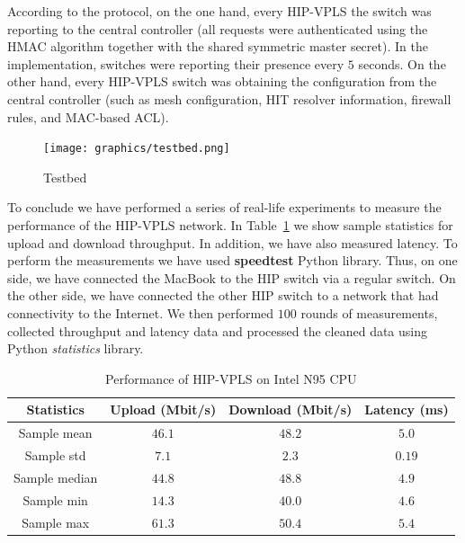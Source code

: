 According to the protocol, on the one hand, every HIP-VPLS 
the switch was reporting to the central controller (all requests were authenticated 
using the HMAC algorithm together with the shared symmetric 
master secret). In the implementation, switches were reporting 
their presence every $5$ seconds. On the other hand, every HIP-VPLS switch was obtaining 
the configuration from the central controller (such as mesh 
configuration, HIT resolver information, firewall rules, and 
MAC-based ACL). 

\begin{figure}[!ht]
    \centering
    \texttt{[image: graphics/testbed.png]}
    \caption{Testbed}
    \label{fig:testbed}
\end{figure}

To conclude we have performed a series of real-life experiments to measure the 
performance of the HIP-VPLS network. In Table~\ref{tab:vpls-performance} we show
sample statistics for upload and download throughput. In addition, we have also
measured latency. To perform the measurements we have used {\bf speedtest}
Python library. Thus, on one side, we have connected the MacBook to the HIP switch via a regular
switch. On the other side, we have connected the other HIP switch to a network 
that had connectivity to the Internet. We then performed $100$ rounds of measurements,
collected throughput and latency data and processed the cleaned data using Python
{\it statistics} library. 

\begin{table}
    \centering
    \begin{tabular}{|c|c|c|c|}
    \hline
    Statistics     & Upload (Mbit/s)        & Download (Mbit/s)     & Latency (ms) \\\hline
    Sample mean    & $46.1$                  & $48.2$                 & $5.0$         \\
    Sample std     & $7.1$                   & $2.3$                  & $0.19$        \\
    Sample median  & $44.8$                  & $48.8$                 & $4.9$         \\
    Sample min     & $14.3$                  & $40.0$                 & $4.6$         \\
    Sample max     & $61.3$                  & $50.4$                 & $5.4$         \\
    \hline
    \end{tabular}
    \caption{Performance of HIP-VPLS on Intel N95 CPU}  
    \label{tab:vpls-performance}
\end{table}


